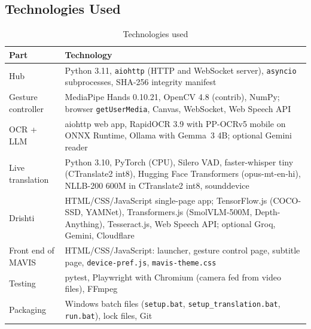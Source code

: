 \documentclass[12pt,singleside,a4paper]{article}
\begin{document}
\subsection{Technologies Used}
\begin{table}[H]
\centering
\caption{Technologies used}
\label{tab:tech}
\small
\begin{tabularx}{\textwidth}{@{}p{3.3cm}X@{}}
\toprule
\textbf{Part} & \textbf{Technology} \\
\midrule
Hub & Python 3.11, \texttt{aiohttp} (HTTP and WebSocket server), \texttt{asyncio} subprocesses, SHA-256 integrity manifest \\
Gesture controller & MediaPipe Hands 0.10.21, OpenCV 4.8 (contrib), NumPy; browser \texttt{getUserMedia}, Canvas, WebSocket, Web Speech API \\
OCR + LLM & aiohttp web app, RapidOCR 3.9 with PP-OCRv5 mobile on ONNX Runtime, Ollama with Gemma~3 4B; optional Gemini reader \\
Live translation & Python 3.10, PyTorch (CPU), Silero VAD, faster-whisper tiny (CTranslate2 int8), Hugging Face Transformers (opus-mt-en-hi), NLLB-200 600M in CTranslate2 int8, sounddevice \\
Drishti & HTML/CSS/JavaScript single-page app; TensorFlow.js (COCO-SSD, YAMNet), Transformers.js (SmolVLM-500M, Depth-Anything), Tesseract.js, Web Speech API; optional Groq, Gemini, Cloudflare \\
Front end of MAVIS & HTML/CSS/JavaScript: launcher, gesture control page, subtitle page, \texttt{device-pref.js}, \texttt{mavis-theme.css} \\
Testing & pytest, Playwright with Chromium (camera fed from video files), FFmpeg \\
Packaging & Windows batch files (\texttt{setup.bat}, \texttt{setup\_translation.bat}, \texttt{run.bat}), lock files, Git \\
\bottomrule
\end{tabularx}
\end{table}
\end{document}
